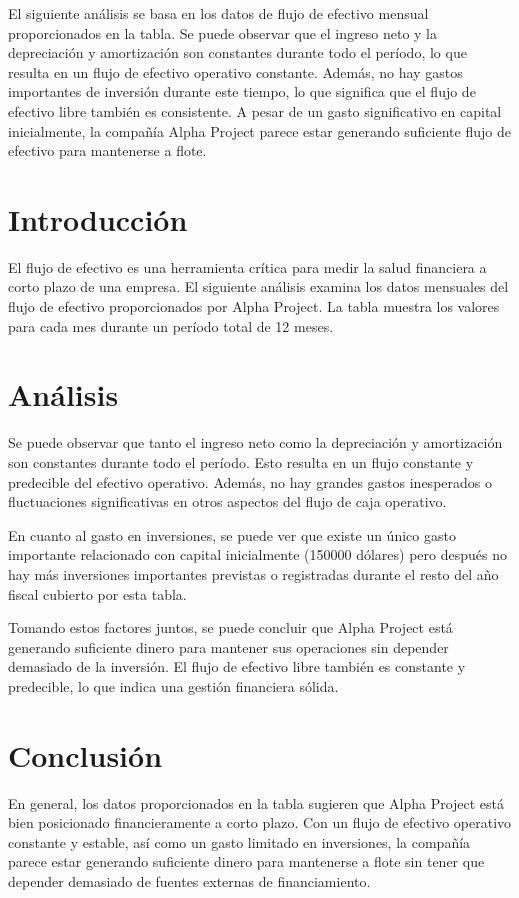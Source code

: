 
El siguiente análisis se basa en los datos de flujo de efectivo mensual proporcionados en la tabla. Se puede observar que el ingreso neto y la depreciación y amortización son constantes durante todo el período, lo que resulta en un flujo de efectivo operativo constante. Además, no hay gastos importantes de inversión durante este tiempo, lo que significa que el flujo de efectivo libre también es consistente. A pesar de un gasto significativo en capital inicialmente, la compañía Alpha Project parece estar generando suficiente flujo de efectivo para mantenerse a flote.

\section{Introducción}

El flujo de efectivo es una herramienta crítica para medir la salud financiera a corto plazo de una empresa. El siguiente análisis examina los datos mensuales del flujo de efectivo proporcionados por Alpha Project. La tabla muestra los valores para cada mes durante un período total de 12 meses.

\section{Análisis}

Se puede observar que tanto el ingreso neto como la depreciación y amortización son constantes durante todo el período. Esto resulta en un flujo constante y predecible del efectivo operativo. Además, no hay grandes gastos inesperados o fluctuaciones significativas en otros aspectos del flujo de caja operativo.

En cuanto al gasto en inversiones, se puede ver que existe un único gasto importante relacionado con capital inicialmente (150000 dólares) pero después no hay más inversiones importantes previstas o registradas durante el resto del año fiscal cubierto por esta tabla.

Tomando estos factores juntos, se puede concluir que Alpha Project está generando suficiente dinero para mantener sus operaciones sin depender demasiado de la inversión. El flujo de efectivo libre también es constante y predecible, lo que indica una gestión financiera sólida.

\section{Conclusión}

En general, los datos proporcionados en la tabla sugieren que Alpha Project está bien posicionado financieramente a corto plazo. Con un flujo de efectivo operativo constante y estable, así como un gasto limitado en inversiones, la compañía parece estar generando suficiente dinero para mantenerse a flote sin tener que depender demasiado de fuentes externas de financiamiento.